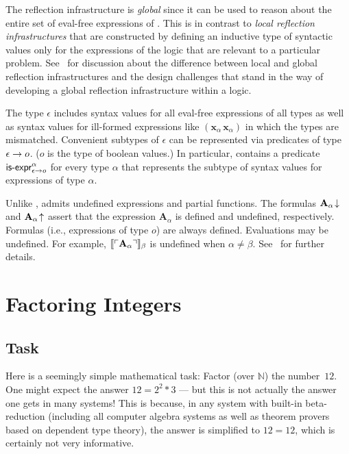 \documentclass[fleqn]{llncs}
\newcommand{\NN}{\ensuremath{\mathbb{N}}}
\begin{document}
The reflection infrastructure is \emph{global} since it can be used to
reason about the entire set of eval-free expressions of {\churchuqe}.
This is in contrast to \emph{local reflection infrastructures} that
are constructed by defining an inductive type of syntactic values only
for the expressions of the logic that are relevant to a particular
problem.  See~\cite{Farmer18} for discussion about the difference
between local and global reflection infrastructures and the design
challenges that stand in the way of developing a global reflection
infrastructure within a logic.

The type $\epsilon$ includes syntax values for all eval-free
expressions of all types as well as syntax values for ill-formed
expressions like $(\textbf{x}_\alpha \, \textbf{x}_\alpha)$ in which
the types are mismatched.  Convenient subtypes of $\epsilon$ can be
represented via predicates of type $\epsilon \rightarrow o$.  ($o$ is the
type of boolean values.)  In particular, {\churchuqe} contains a
predicate $\mbox{\sf is-expr}^{\alpha}_{\epsilon \rightarrow o}$ for every type
$\alpha$ that represents the subtype of syntax values for expressions
of type $\alpha$.

Unlike {\churchqe}, {\churchuqe} admits undefined expressions and
partial functions.  The formulas $\textbf{A}_\alpha\!\downarrow$ and
$\textbf{A}_\alpha\!\uparrow$ assert that the expression
$\textbf{A}_\alpha$ is defined and undefined, respectively.  Formulas
(i.e., expressions of type $o$) are always defined.  Evaluations may
be undefined.  For example,
$\llbracket\ulcorner\textbf{A}_\alpha\urcorner\rrbracket_\beta$ is undefined when
$\alpha \not= \beta$.  See~\cite{Farmer08a,Farmer17} for further
details.

\section{Factoring Integers}\label{sec:factoring}

\subsection{Task}

Here is a seemingly simple mathematical task: Factor (over $\NN$)
the number~$12$.  One might expect the answer $12 = 2^2 * 3$ ---
but this is not actually the answer one gets in many systems!  This is
because, in any system with built-in beta-reduction (including all
computer algebra systems as well as theorem provers based on dependent
type theory), the answer is simplified to $12 = 12$, which is
certainly not very informative.
\end{document}
